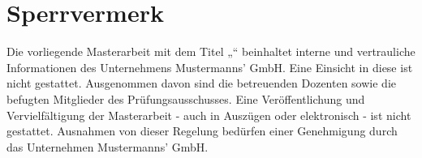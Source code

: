 \chapter*{Sperrvermerk}

\newcommand{\CompanyName}{Mustermanns' GmbH}


Die vorliegende Masterarbeit mit dem Titel „\TitleOfWork“ beinhaltet interne und vertrauliche Informationen des Unternehmens \CompanyName. Eine Einsicht in diese \DegreeThesisType ist nicht gestattet. Ausgenommen davon sind die betreuenden Dozenten sowie die befugten Mitglieder des Prüfungsausschusses. Eine Veröffentlichung und Vervielfältigung der Masterarbeit - auch in Auszügen oder elektronisch - ist nicht gestattet. Ausnahmen von dieser Regelung bedürfen einer Genehmigung durch das Unternehmen \CompanyName.